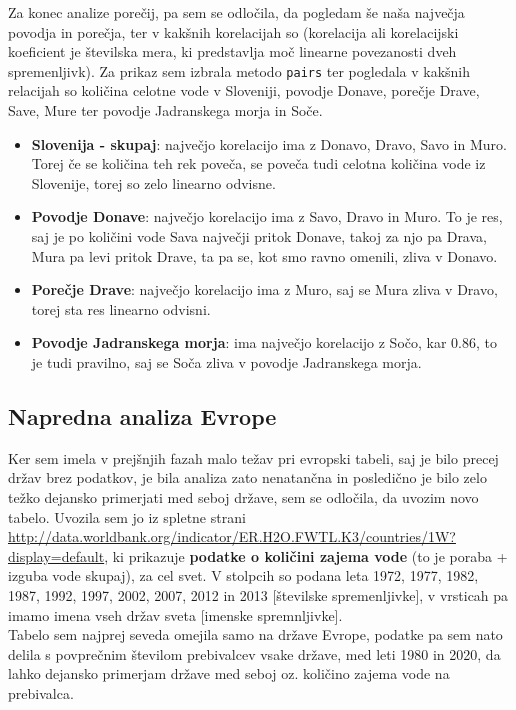 \documentclass[11pt,a4paper]{article}
\begin{document}
\newpage

Za konec analize porečij, pa sem se odločila, da pogledam še naša največja povodja in porečja, ter v kakšnih korelacijah so (korelacija ali korelacijski koeficient je številska mera, ki predstavlja moč linearne povezanosti dveh spremenljivk). Za prikaz sem izbrala metodo \verb|pairs| ter pogledala v kakšnih relacijah so količina celotne vode v Sloveniji, povodje Donave, porečje Drave, Save, Mure ter povodje Jadranskega morja in Soče.


\begin{itemize}
\item{\textbf{Slovenija - skupaj}: največjo korelacijo ima z Donavo, Dravo, Savo in Muro. Torej če se količina teh rek poveča, se poveča tudi celotna količina vode iz Slovenije, torej so zelo linearno odvisne.}

\item{\textbf{Povodje Donave}: največjo korelacijo ima z Savo, Dravo in Muro. To je res, saj je po količini vode Sava največji pritok Donave, takoj za njo pa Drava, Mura pa levi pritok Drave, ta pa se, kot smo ravno omenili, zliva v Donavo.}

\item{\textbf{Porečje Drave}: največjo korelacijo ima z Muro, saj se Mura zliva v Dravo, torej sta res linearno odvisni.}

\item{\textbf{Povodje Jadranskega morja}: ima največjo korelacijo z Sočo, kar 0.86, to je tudi pravilno, saj se Soča zliva v povodje Jadranskega morja.}
\end{itemize}

\newpage
\subsection{Napredna analiza Evrope}
Ker sem imela v prejšnjih fazah malo težav pri evropski tabeli, saj je bilo precej držav brez podatkov, je bila analiza zato nenatančna in posledično je bilo zelo težko dejansko primerjati med seboj države, sem se odločila, da uvozim novo tabelo. Uvozila sem jo iz spletne strani \url{http://data.worldbank.org/indicator/ER.H2O.FWTL.K3/countries/1W?display=default}, ki prikazuje \textbf{podatke o količini zajema vode} (to je poraba + izguba vode skupaj), za cel svet. V stolpcih so podana leta 1972, 1977, 1982, 1987, 1992, 1997, 2002, 2007, 2012 in 2013 [številske spremenljivke], v vrsticah pa imamo imena vseh držav sveta [imenske spremnljivke].\\ 
Tabelo sem najprej seveda omejila samo na države Evrope, podatke pa sem nato delila s povprečnim številom prebivalcev vsake države, med leti 1980 in 2020, da lahko dejansko primerjam države med seboj oz. količino zajema vode na prebivalca.\\
\end{document}
